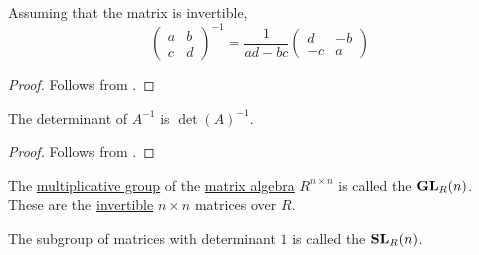 \begin{proposition}\label{thm:inverse_of_2x2_matrix}
  Assuming that the matrix is invertible,
  \begin{equation*}
    \begin{pmatrix}
      a & b \\
      c & d
    \end{pmatrix}^{-1}
    =
    \frac 1 {ad - bc}
    \begin{pmatrix}
      d  & -b \\
      -c & a
    \end{pmatrix}
  \end{equation*}
\end{proposition}
\begin{proof}
  Follows from .
\end{proof}

\begin{proposition}\label{thm:determinant_of_inverse}
  The determinant of \( A^{-1} \) is \( \det(A)^{-1} \).
\end{proposition}
\begin{proof}
  Follows from .
\end{proof}

\begin{definition}\label{def:linear_groups}\mimprovised
  The \hyperref[def:semiring]{multiplicative group} of the \hyperref[thm:matrix_algebra]{matrix algebra} \( R^{n \times n} \) is called the  \( \grp{GL}_R(n) \). These are the \hyperref[def:inverse_matrix]{invertible} \( n \times n \) matrices over \( R \).

  The subgroup of matrices with determinant \( 1 \) is called the  \( \grp{SL}_R(n) \).
\end{definition}

